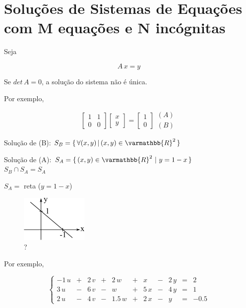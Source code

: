 \section{Soluções de Sistemas de Equações com M equações e N incógnitas}

Seja

\[
 A \, x = y
\]

Se $ det \, A = 0 $, a solução do sistema não é única.

Por exemplo,

\[
 \left[
  \begin{array}{cc}
   1 & 1 \\
   0 & 0
  \end{array}
 \right]
 \left[
  \begin{array}{c}
   x \\
   y
  \end{array}
 \right]
 =
 \left[
  \begin{array}{c}
   1 \\
   0
  \end{array}
 \right]
  \begin{array}{r}
   (A) \\
   (B)
  \end{array}
\]

Solução de (B): $ S_B = \{ \, \forall(x,y) \, | \, (x,y) \in \varmathbb{R}^2 \, \} $

Solução de (A): $ S_A = \{ \, (x,y) \in \varmathbb{R}^2 \, \, | \, \, y = 1 - x \, \} $\\

$ S_B \cap S_A = S_A $

$ S_A = $ reta ($ y = 1 -x $)

\begin{figure}[htb]
 \centering
 \includegraphics[scale=1.0]{capitulos/capitulo4/figuras/sol_sist_equa_m_equa_n_incog1.png}
 \caption{?}
 \label{fig:sol_sist_equa_m_equa_n_incog1}
\end{figure}

Por exemplo,

\[
 \left\{
  \begin{array}{rrrrrrrrrrr}
   -1 \, u & + & 2 \, v & + & 2 \, w & + & x & - & 2 \, y & = & 2\\
   3 \, u & - & 6 \, v & - & w & + & 5 \, x & - & 4 \,y & = & 1\\
   2 \, u & - & 4 \, v & - & 1.5 \, w & + & 2 \, x & - & y & = & -0.5
  \end{array}
 \right.
\]

